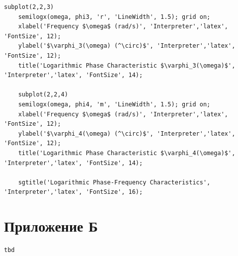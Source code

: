 \documentclass[a4paper, 12pt]{article}
\begin{document}
\begin{lstlisting}[label=task1, caption={Программа для задания 1}]
    subplot(2,2,3)
    semilogx(omega, phi3, 'r', 'LineWidth', 1.5); grid on;
    xlabel('Frequency $\omega$ (rad/s)', 'Interpreter','latex', 'FontSize', 12);
    ylabel('$\varphi_3(\omega) (^\circ)$', 'Interpreter','latex', 'FontSize', 12);
    title('Logarithmic Phase Characteristic $\varphi_3(\omega)$', 'Interpreter','latex', 'FontSize', 14);

    subplot(2,2,4)
    semilogx(omega, phi4, 'm', 'LineWidth', 1.5); grid on;
    xlabel('Frequency $\omega$ (rad/s)', 'Interpreter','latex', 'FontSize', 12);
    ylabel('$\varphi_4(\omega) (^\circ)$', 'Interpreter','latex', 'FontSize', 12);
    title('Logarithmic Phase Characteristic $\varphi_4(\omega)$', 'Interpreter','latex', 'FontSize', 14);

    sgtitle('Logarithmic Phase-Frequency Characteristics', 'Interpreter','latex', 'FontSize', 16);
    \end{lstlisting}


    \section{Приложение Б}
    \begin{lstlisting}[label=task2, caption={Программа для задания 2}]
        tbd
    \end{lstlisting}
\end{document}
